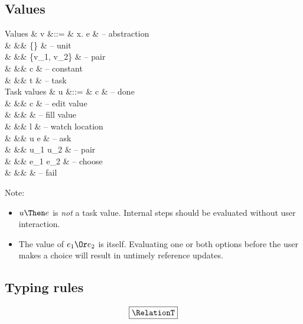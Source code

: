\subsection{Values}

\begin{grammar}
  Values
    & v      &::= & \lambda x. e                & – abstraction \\
    &        &\mid& \{\}                        & – unit \\
    &        &\mid& \{v_1, v_2\}                & – pair \\
    &        &\mid& c                           & – constant \\
    &        &\mid& t                           & – task \\
  Task values
    & u      &::= & \Done c                     & – done \\
    &        &\mid& \Edit c                     & – edit value \\
    &        &\mid& \Fill \beta                 & – fill value \\
    &        &\mid& \Watch l                    & – watch location \\
    &        &\mid& u \Next e                   & – ask \\
    &        &\mid& u_1 \And u_2                & – pair \\
    &        &\mid& e_1 \Or e_2                 & – choose \\
    &        &\mid& \Fail                       & – fail \\
\end{grammar}

Note:
\begin{itemize}
  \item $u \Then e$ is \emph{not} a task value.
    Internal steps should be evaluated without user interaction.
  \item The value of $e_1 \Or e_2$ is itself.
    Evaluating one or both options before the user makes a choice will result in untimely reference updates.
\end{itemize}


\statefultrue


\newpage
\subsection{Typing rules}

\begin{equation*}
  \boxed{\RelationT}
\end{equation*}


